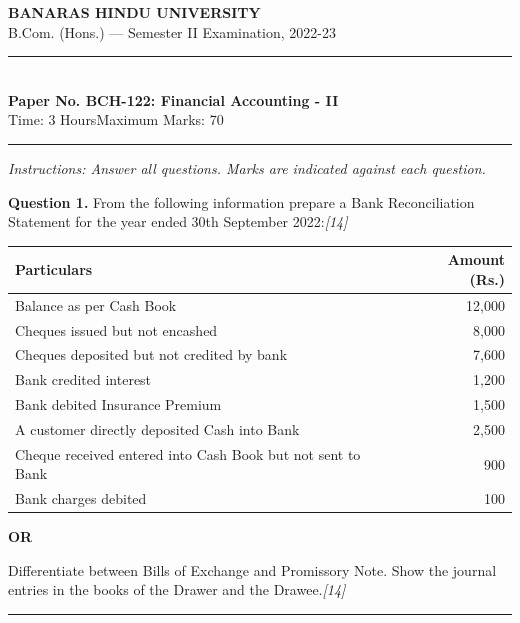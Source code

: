 \documentclass[11pt,a4paper]{article}
\newcommand{\pts}[1]{\hfill   \textit{[#1]}}
\begin{document}
\begin{center}
  {\large\bfseries BANARAS HINDU UNIVERSITY}\\[2pt]
  {\normalsize B.Com. (Hons.) --- Semester II Examination, 2022-23}\\[6pt]
  \rule{0.8\linewidth}{0.5pt}\\[6pt]
  {\large\bfseries Paper No. BCH-122: Financial Accounting - II}\\[4pt]
  {\normalsize Time: 3 Hours\hfill Maximum Marks: 70}
\end{center}

\rule{\linewidth}{0.4pt}

\smallskip



\noindent   \textit{Instructions: Answer all questions. Marks are indicated against each question.}

\bigskip




\noindent   \textbf{Question 1.}
From the following information prepare a Bank Reconciliation Statement for the year ended 30th September 2022:\pts{14}

\begin{center}
  \small
  
\begin{tabular}{|l|r|}
    \hline
   \textbf{Particulars} &   \textbf{Amount (Rs.)} \\
    \hline
    Balance as per Cash Book & 12,000 \\
    Cheques issued but not encashed & 8,000 \\
    Cheques deposited but not credited by bank & 7,600 \\
    Bank credited interest & 1,200 \\
    Bank debited Insurance Premium & 1,500 \\
    A customer directly deposited Cash into Bank & 2,500 \\
    Cheque received entered into Cash Book but not sent to Bank & 900 \\
    Bank charges debited & 100 \\
    \hline
  \end{tabular}
\end{center}

\centerline{   \textbf{OR}}

Differentiate between Bills of Exchange and Promissory Note. Show the journal entries in the books of the Drawer and the Drawee.\pts{14}

\medskip\rule{\linewidth}{0.2pt}
\end{document}
